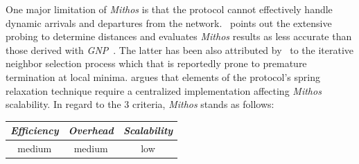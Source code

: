 One major limitation of \emph{Mithos} is that the protocol cannot effectively
handle dynamic arrivals and departures from the network. 
\cite{CCRK2004}~points out the extensive probing to determine 
distances and evaluates \emph{Mithos} results as less accurate
than those derived with \emph{GNP}~\cite{ng_gnp_2001}. 
The latter has been also attributed by~\cite{WSS2005} to 
the iterative neighbor selection process which that is 
reportedly prone to premature termination at local minima.
\cite{cox_vivaldi_2004} argues that elements of the protocol's
spring relaxation technique require a centralized implementation 
affecting \emph{Mithos} scalability.
In regard to the $3$ criteria, \emph{Mithos} stands as follows:
\begin{center}
{\footnotesize
\begin{tabular}{ccc}
\emph{Efficiency} & \emph{Overhead} & \emph{Scalability} \\
\hline
medium &
medium &
low
\end{tabular}
}
\end{center}

